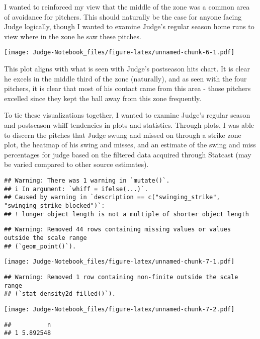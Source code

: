 \documentclass[
]{article}
\begin{document}
I wanted to reinforced my view that the middle of the zone was a common
area of avoidance for pitchers. This should naturally be the case for
anyone facing Judge logically, though I wanted to examine Judge's
regular season home runs to view where in the zone he saw these pitches.

\texttt{[image: Judge-Notebook\_files/figure-latex/unnamed-chunk-6-1.pdf]}

This plot aligns with what is seen with Judge's postseason hits chart.
It is clear he excels in the middle third of the zone (naturally), and
as seen with the four pitchers, it is clear that most of his contact
came from this area - those pitchers excelled since they kept the ball
away from this zone frequently.

To tie these visualizations together, I wanted to examine Judge's
regular season and postseason whiff tendencies in plots and statistics.
Through plots, I was able to discern the pitches that Judge swung and
missed on through a strike zone plot, the heatmap of his swing and
misses, and an estimate of the swing and miss percentages for judge
based on the filtered data acquired through Statcast (may be varied
compared to other source estimates).

\begin{verbatim}
## Warning: There was 1 warning in `mutate()`.
## i In argument: `whiff = ifelse(...)`.
## Caused by warning in `description == c("swinging_strike", "swinging_strike_blocked")`:
## ! longer object length is not a multiple of shorter object length
\end{verbatim}

\begin{verbatim}
## Warning: Removed 44 rows containing missing values or values outside the scale range
## (`geom_point()`).
\end{verbatim}

\texttt{[image: Judge-Notebook\_files/figure-latex/unnamed-chunk-7-1.pdf]}

\begin{verbatim}
## Warning: Removed 1 row containing non-finite outside the scale range
## (`stat_density2d_filled()`).
\end{verbatim}

\texttt{[image: Judge-Notebook\_files/figure-latex/unnamed-chunk-7-2.pdf]}

\begin{verbatim}
##          n
## 1 5.892548
\end{verbatim}
\end{document}
